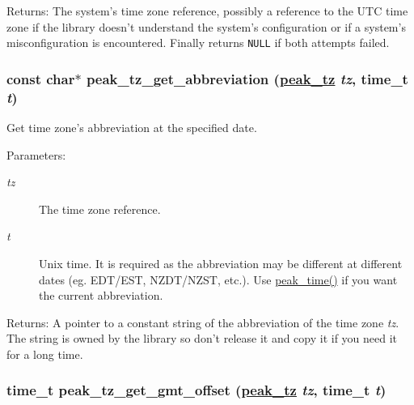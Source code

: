 \begin{Desc}
\item[Returns:]The system's time zone reference, possibly a reference to the UTC time zone if the library doesn't understand the system's configuration or if a system's misconfiguration is encountered. Finally returns {\tt NULL} if both attempts failed. \end{Desc}
\hypertarget{group__tz_ga4}{
\subsubsection[peak\_\-tz\_\-get\_\-abbreviation]{\setlength{\rightskip}{0pt plus 5cm}const char$\ast$ peak\_\-tz\_\-get\_\-abbreviation (\hyperlink{group__tz_ga0}{peak\_\-tz} {\em tz}, time\_\-t {\em t})}}
\label{group__tz_ga4}


Get time zone's abbreviation at the specified date. 

\begin{Desc}
\item[Parameters:]
\begin{description}
\item[{\em tz}]The time zone reference. \item[{\em t}]Unix time. It is required as the abbreviation may be different at different dates (eg. EDT/EST, NZDT/NZST, etc.). Use \hyperlink{group__time_ga6}{peak\_\-time()} if you want the current abbreviation.\end{description}
\end{Desc}
\begin{Desc}
\item[Returns:]A pointer to a constant string of the abbreviation of the time zone {\em tz\/}. The string is owned by the library so don't release it and copy it if you need it for a long time. \end{Desc}
\hypertarget{group__tz_ga5}{
\subsubsection[peak\_\-tz\_\-get\_\-gmt\_\-offset]{\setlength{\rightskip}{0pt plus 5cm}time\_\-t peak\_\-tz\_\-get\_\-gmt\_\-offset (\hyperlink{group__tz_ga0}{peak\_\-tz} {\em tz}, time\_\-t {\em t})}}
\label{group__tz_ga5}


